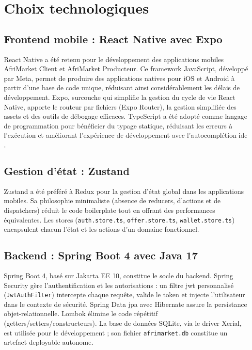 \documentclass[12pt, a4paper, oneside]{report}
\begin{document}
\section{Choix technologiques}

\subsection{Frontend mobile : React Native avec Expo}

React Native a été retenu pour le développement des applications mobiles AfriMarket
Client et AfriMarket Producteur. Ce framework JavaScript, développé par Meta, permet de
produire des applications natives pour iOS et Android à partir d'une base de code unique,
réduisant ainsi considérablement les délais de développement. Expo, surcouche qui simplifie
la gestion du cycle de vie React Native, apporte le routeur par fichiers (Expo Router),
la gestion simplifiée des assets et des outils de débogage efficaces.
TypeScript a été adopté comme langage de programmation pour bénéficier du typage statique,
réduisant les erreurs à l'exécution et améliorant l'expérience de développement avec
l'autocomplétion \gls{ide} \cite{cherny2019}.

\subsection{Gestion d'état : Zustand}

Zustand a été préféré à Redux pour la gestion d'état global dans les applications mobiles.
Sa philosophie minimaliste (absence de reducers, d'actions et de dispatchers) réduit le
code boilerplate tout en offrant des performances équivalentes. Les stores
(\texttt{auth.store.ts}, \texttt{offer.store.ts}, \texttt{wallet.store.ts}) encapsulent
chacun l'état et les actions d'un domaine fonctionnel.

\subsection{Backend : Spring Boot 4 avec Java 17}

Spring Boot 4, basé sur Jakarta EE 10, constitue le socle du backend. Spring Security
gère l'authentification et les autorisations : un filtre \gls{jwt} personnalisé
(\texttt{JwtAuthFilter}) intercepte chaque requête, valide le token et injecte
l'utilisateur dans le contexte de sécurité. Spring Data \gls{jpa} avec Hibernate assure
la persistance objet-relationnelle. Lombok élimine le code répétitif
(getters/setters/constructeurs). La base de données SQLite, via le driver Xerial, est
utilisée pour le développement ; son fichier \texttt{afrimarket.db} constitue un artefact
deployable autonome.
\end{document}
